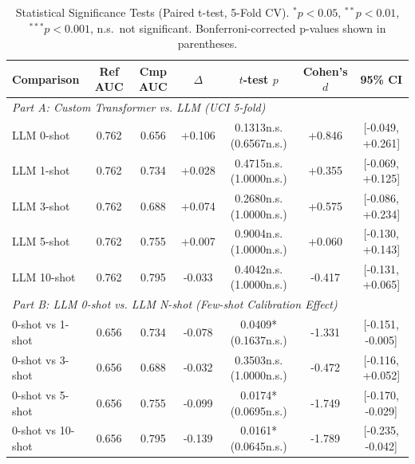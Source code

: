 \begin{table}[htbp]
\centering
\caption{Statistical Significance Tests (Paired t-test, 5-Fold CV). $^*p{<}0.05$, $^{**}p{<}0.01$, $^{***}p{<}0.001$, n.s.~not significant. Bonferroni-corrected p-values shown in parentheses.}
\label{tab:stat_llm}
\begin{tabular}{lcccccc}
\toprule
Comparison & Ref AUC & Cmp AUC & $\Delta$ & $t$-test $p$ & Cohen's $d$ & 95\% CI \\
\midrule
\multicolumn{7}{l}{\textit{Part A: Custom Transformer vs. LLM (UCI 5-fold)}} \\
LLM 0-shot & 0.762 & 0.656 & +0.106 & 0.1313n.s. (0.6567n.s.) & +0.846 & [-0.049, +0.261] \\
LLM 1-shot & 0.762 & 0.734 & +0.028 & 0.4715n.s. (1.0000n.s.) & +0.355 & [-0.069, +0.125] \\
LLM 3-shot & 0.762 & 0.688 & +0.074 & 0.2680n.s. (1.0000n.s.) & +0.575 & [-0.086, +0.234] \\
LLM 5-shot & 0.762 & 0.755 & +0.007 & 0.9004n.s. (1.0000n.s.) & +0.060 & [-0.130, +0.143] \\
LLM 10-shot & 0.762 & 0.795 & -0.033 & 0.4042n.s. (1.0000n.s.) & -0.417 & [-0.131, +0.065] \\
\midrule
\multicolumn{7}{l}{\textit{Part B: LLM 0-shot vs. LLM N-shot (Few-shot Calibration Effect)}} \\
0-shot vs 1-shot & 0.656 & 0.734 & -0.078 & 0.0409* (0.1637n.s.) & -1.331 & [-0.151, -0.005] \\
0-shot vs 3-shot & 0.656 & 0.688 & -0.032 & 0.3503n.s. (1.0000n.s.) & -0.472 & [-0.116, +0.052] \\
0-shot vs 5-shot & 0.656 & 0.755 & -0.099 & 0.0174* (0.0695n.s.) & -1.749 & [-0.170, -0.029] \\
0-shot vs 10-shot & 0.656 & 0.795 & -0.139 & 0.0161* (0.0645n.s.) & -1.789 & [-0.235, -0.042] \\
\bottomrule
\end{tabular}
\end{table}